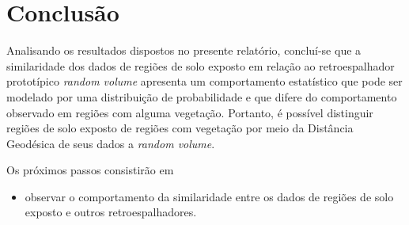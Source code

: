 \documentclass[12pt]{article}
\begin{document}
\section{Conclusão}

Analisando os resultados dispostos no presente relatório, concluí-se que a similaridade dos dados de regiões de solo exposto em relação ao retroespalhador prototípico \textit{random volume} apresenta um comportamento estatístico que pode ser modelado por uma distribuição de probabilidade e que difere do comportamento observado em regiões com alguma vegetação. Portanto, é possível distinguir regiões de solo exposto de regiões com vegetação por meio da Distância Geodésica de seus dados a \textit{random volume}.

Os próximos passos consistirão em
\begin{itemize}
  \item observar o comportamento da similaridade entre os dados de regiões de solo exposto e outros retroespalhadores.
\end{itemize}
\end{document}
